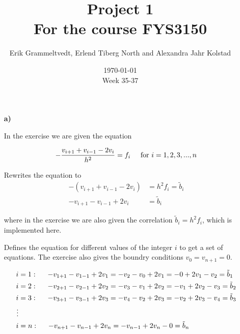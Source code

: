 \documentclass{article}
\newcounter{excount}
\newenvironment{exercise}[1][]{\addtocounter{excount}{1} \noindent {\bf Exercise
\arabic{excount} \ \ #1}\hspace{2mm}}{\vspace{4mm}}
\begin{document}
\addtocounter{page}{0}

\title{Project 1 \\
      \large For the course FYS3150}
\date{\today \\
    \vspace{1mm}
    \large Week 35-37}

\author{Erik Grammeltvedt, Erlend Tiberg North and Alexandra Jahr Kolstad}

\maketitle

\begin{exercise}


\begin{itemize}
    \item[ \bf a)]

        In the exercise we are given the equation

        \begin{equation*}
            - \frac{v_{i+1} + v_{i-1} - 2 v_i}{h^2} = f_i \hspace{5mm} \textrm{for} ~  i = 1, 2, 3, ... , n
        \end{equation*}

        Rewrites the equation to
        \begin{align*}
            - (v_{i+1} + v_{i-1} - 2 v_i) &= h^2 f_i = \tilde{b}_i \\
            - v_{i+1} - v_{i-1} + 2 v_i &= \tilde{b}_i
        \end{align*}

        where in the exercise we are also given the correlation $\tilde{b}_i = h^2 f_i$, which is implemented here.

        Defines the equation for different values of the integer $i$ to get a set of equations. The exercise also gives the boundry conditions $v_0 = v_{n+1} = 0$.

        \begin{align*}
            i &= 1 : \hspace{5mm} - v_{1+1} - v_{1-1} + 2 v_1 = - v_2 - v_0 + 2 v_1 = - 0 + 2 v_1 - v_2 = \tilde{b}_1 \\
            i &= 2 : \hspace{5mm} - v_{2+1} - v_{2-1} + 2 v_2 = - v_3 - v_1 + 2 v_2 = - v_1 + 2 v_2 - v_3 = \tilde{b}_2 \\
            i &= 3 : \hspace{5mm} - v_{3+1} - v_{3-1} + 2 v_3 = - v_4 - v_2 + 2 v_3 = - v_2 + 2 v_3 - v_4 = \tilde{b}_3 \\
            \vdots \\
            i &= n : \hspace{5mm} - v_{n+1} - v_{n-1} + 2 v_n = - v_{n-1} + 2 v_n - 0 = \tilde{b}_n \\
        \end{align*}


\end{itemize}
\end{exercise}
\end{document}
